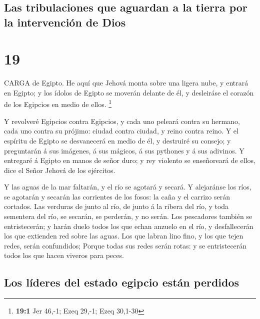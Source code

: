 \hypertarget{las-tribulaciones-que-aguardan-a-la-tierra-por-la-intervenciuxf3n-de-dios}{%
\subsection{Las tribulaciones que aguardan a la tierra por la
intervención de
Dios}\label{las-tribulaciones-que-aguardan-a-la-tierra-por-la-intervenciuxf3n-de-dios}}

\hypertarget{section-18}{%
\section{19}\label{section-18}}

 CARGA de Egipto. He aquí que Jehová monta sobre una ligera
nube, y entrará en Egipto; y los ídolos de Egipto se moverán delante de
él, y desleiráse el corazón de los Egipcios en medio de ellos.
\footnote{\textbf{19:1} Jer 46,-1; Ezeq 29,-1; Ezeq 30,1-30}

 Y revolveré Egipcios contra Egipcios, y cada uno peleará
contra su hermano, cada uno contra su prójimo: ciudad contra ciudad, y
reino contra reino.  Y el espíritu de Egipto se desvanecerá
en medio de él, y destruiré su consejo; y preguntarán á sus imágenes, á
sus mágicos, á sus pythones y á sus adivinos.  Y entregaré á
Egipto en manos de señor duro; y rey violento se enseñoreará de ellos,
dice el Señor Jehová de los ejércitos.

 Y las aguas de la mar faltarán, y el río se agotará y
secará.  Y alejaránse los ríos, se agotarán y secarán las
corrientes de los fosos: la caña y el carrizo serán cortados.
 Las verduras de junto al río, de junto á la ribera del río,
y toda sementera del río, se secarán, se perderán, y no serán.
 Los pescadores también se entristecerán; y harán duelo
todos los que echan anzuelo en el río, y desfallecerán los que extienden
red sobre las aguas.  Los que labran lino fino, y los que
tejen redes, serán confundidos;  Porque todas sus redes
serán rotas: y se entristecerán todos los que hacen viveros para peces.

\hypertarget{los-luxedderes-del-estado-egipcio-estuxe1n-perdidos}{%
\subsection{Los líderes del estado egipcio están
perdidos}\label{los-luxedderes-del-estado-egipcio-estuxe1n-perdidos}}

